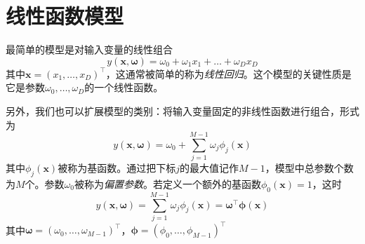 \documentclass[11pt]{ctexbook}
\begin{document}
\section{线性函数模型}
最简单的模型是对输入变量的线性组合
\begin{equation}
	y(\bm x, \bm \omega) = \omega_0 + \omega_1 x_1 + \ldots +\omega_D x_D
\end{equation}
其中$\bm x=(x_1, \ldots, x_D)^\top$，这通常被简单的称为\emph{线性回归}。这个模型的关键性质是它是参数$\omega_0, \ldots, \omega_D$的一个线性函数。

另外，我们也可以扩展模型的类别：将输入变量固定的非线性函数进行组合，形式为
\begin{equation}
	y(\bm x,\bm \omega) = \omega_0 + \sum_{j=1}^{M-1}\omega_j\phi_j(\bm x)
\end{equation}
其中$\phi_j(\bm x)$被称为基函数。通过把下标$j$的最大值记作$M-1$，模型中总参数个数为$M$个。参数$\omega_0$被称为\emph{偏置参数}。若定义一个额外的基函数$\phi_0(\bm x)=1$，这时
\begin{equation}
	y(\bm x, \bm \omega) = \sum_{j=1}^{M-1}\omega_j\phi_j(\bm x) = \bm \omega^\top\bm \phi(\bm x)
\end{equation}
其中$\bm\omega=(\omega_0, \ldots, \omega_{M-1})^\top$，$\bm \phi =(\phi_0, \ldots, \phi_{M-1})^\top$
\end{document}
